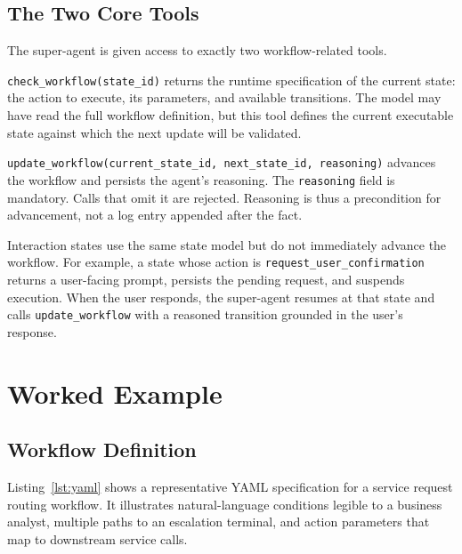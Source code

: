 \documentclass[10pt,conference]{IEEEtran}
\begin{document}
\subsection{The Two Core Tools}

The super-agent is given access to exactly two workflow-related
tools.

\texttt{check\_workflow(state\_id)} returns the runtime
specification of the current state: the action to execute, its
parameters, and available transitions.  The model may have read
the full workflow definition, but this tool defines the current
executable state against which the next update will be validated.

{\sloppy\texttt{update\_workflow(current\_state\_id,~next\_state\_id,~reasoning)} advances the
workflow and persists the agent's reasoning.}  The
\texttt{reasoning} field is mandatory.  Calls that omit it are
rejected.  Reasoning is thus a precondition for advancement, not
a log entry appended after the fact.

Interaction states use the same state model but do not immediately
advance the workflow.  For example, a state whose action is
\texttt{request\_user\_confirmation} returns a user-facing prompt,
persists the pending request, and suspends execution.  When the
user responds, the super-agent resumes at that state and calls
\texttt{update\_workflow} with a reasoned transition grounded in
the user's response.


\section{Worked Example}
\label{sec:example}

\subsection{Workflow Definition}

Listing~\ref{lst:yaml} shows a representative YAML specification
for a service request routing workflow.  It illustrates
natural-language conditions legible to a business analyst,
multiple paths to an escalation terminal, and action parameters
that map to downstream service calls.
\end{document}
